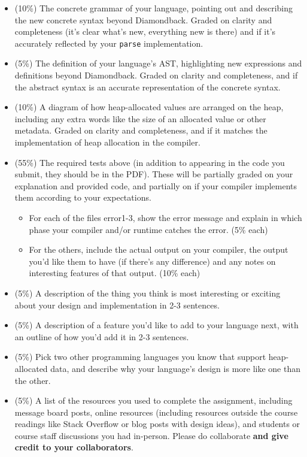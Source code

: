 \documentclass[10pt, oneside]{article}
\begin{document}
\begin{itemize}

\item (10\%) The concrete grammar of your language, pointing out and
describing the new concrete syntax beyond Diamondback. Graded on clarity and
completeness (it's clear what's new, everything new is there) and if it's
accurately reflected by your {\tt parse} implementation.

\item (5\%) The definition of your language's AST, highlighting new
expressions and definitions beyond Diamondback. Graded on clarity and
completeness, and if the abstract syntax is an accurate representation of the
concrete syntax.

\item (10\%) A diagram of how heap-allocated values are arranged on the heap,
including any extra words like the size of an allocated value or other
metadata. Graded on clarity and completeness, and if it matches the
implementation of heap allocation in the compiler.

\item (55\%) The required tests above (in addition to appearing in the code
you submit, they should be in the PDF). These will be partially graded on
your explanation and provided code, and partially on if your compiler
implements them according to your expectations.

  \begin{itemize}

    \item For each of the files error1-3, show the error message and explain
    in which phase your compiler and/or runtime catches the error. (5\% each)

    \item For the others, include the actual output on your compiler, the
    output you'd like them to have (if there's any difference) and any notes
    on interesting features of that output. (10\% each)
  \end{itemize}

  \item (5\%) A description of the thing you think is most interesting or
  exciting about your design and implementation in 2-3 sentences.

  \item (5\%) A description of a feature you'd like to add to your language
  next, with an outline of how you'd add it in 2-3 sentences.

  \item (5\%) Pick two other programming languages you know that support
  heap-allocated data, and describe why your language's design is more like
  one than the other.

  \item (5\%) A list of the resources you used to complete the assignment,
  including message board posts, online resources (including resources
  outside the course readings like Stack Overflow or blog posts with design
  ideas), and students or course staff discussions you had in-person. Please
  do collaborate {\bf and give credit to your collaborators}.

\end{itemize}
\end{document}
